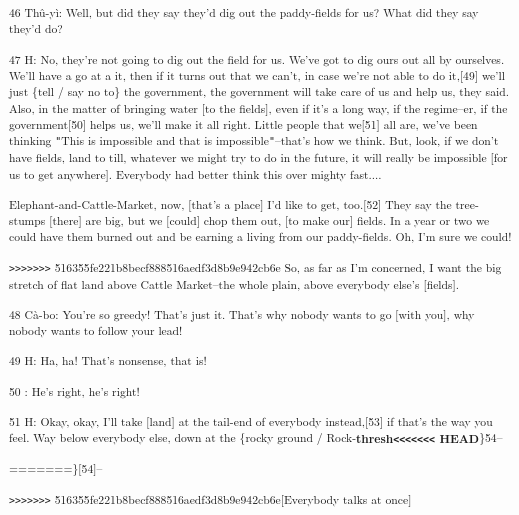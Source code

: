 {\textsuperscript{46 Thû-yì: Well, but did they say they'd dig out the
paddy-fields for us? What did they say they'd do? }}

{\textsuperscript{47 H: No, they're not going to dig out the field for us.
We've got to dig ours out all by ourselves. We'll have a go at a it, then if it
turns out that we can't, in case we're not able to do it,[49] we'll just \{tell
/ say no to\} the government, the government will take care of us and help us,
they said. Also, in the matter of bringing water [to the fields], even if it's
a long way, if the regime--er, if the government[50] helps us, we'll make it all
right. Little people that we[51] all are, we've been thinking \texttt{"}This is
impossible and that is impossible\texttt{"}--that's how we think. But, look, if
we don't have fields, land to till, whatever we might try to do in the future,
it will really be impossible [for us to get anywhere]. Everybody had better think
this over mighty fast.... }}

{\textsuperscript{Elephant-and-Cattle-Market, now, [that's a place] I'd
like to get, too.[52] They say the tree-stumps [there] are big, but we [could]
chop them out, [to make our] fields. In a year or two we could have them burned
out and be earning a living from our paddy-fields. Oh, I'm sure we could!}}

{\textsuperscript{\texttt{>}\texttt{>}\texttt{>}\texttt{>}\texttt{>}\texttt{>}\texttt{>}
516355fe221b8becf888516aedf3d8b9e942cb6e So, as far as I'm concerned, I want the
big stretch of flat land above Cattle Market--the whole plain, above everybody
else's [fields].}}

{\textsuperscript{48 Cà-bo: You're so greedy! That's just it. That's why
nobody wants to go [with you], why nobody wants to follow your lead! }}

{\textsuperscript{49 H: Ha, ha! That's nonsense, that is!}}

{\textsuperscript{50      : He's right, he's right!}}

{\textsuperscript{51 H: Okay, okay, I'll take [land] at the tail-end of
everybody instead,[53] if that's the way you feel. Way below everybody else, down
at the \{rocky ground / Rock-}}{\textsuperscript{\textbf{thresh\texttt{<}\texttt{<}\texttt{<}\texttt{<}\texttt{<}\texttt{<}\texttt{<}
HEAD}}}{\textsuperscript{\}54--}}

\begin{center}
{\textsuperscript{=======\}[54]--}}

{\textsuperscript{\texttt{>}\texttt{>}\texttt{>}\texttt{>}\texttt{>}\texttt{>}\texttt{>}
516355fe221b8becf888516aedf3d8b9e942cb6e[Everybody talks at once]}}
\end{center}

